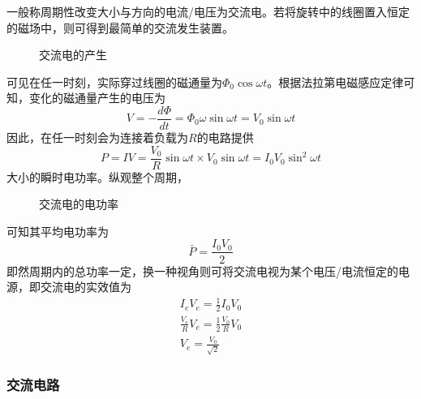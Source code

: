 一般称周期性改变大小与方向的电流/电压为交流电。若将旋转中的线圈置入恒定的磁场中，则可得到最简单的交流发生装置。
\begin{figure}[ht!]
    \centering
    \caption{交流电的产生}
\end{figure}
可见在任一时刻，实际穿过线圈的磁通量为$\Phi_0\cos\omega t$。根据法拉第电磁感应定律可知，变化的磁通量产生的电压为
\begin{equation*}
    V=-\frac{d\Phi}{dt}=\Phi_0\omega\sin\omega t=V_0\sin\omega t
\end{equation*}
因此，在任一时刻会为连接着负载为$R$的电路提供
\begin{equation*}
    P=IV
    =\frac{V_0}{R}\sin\omega t\times V_0\sin\omega t
    =I_0V_0\sin^2\omega t
\end{equation*}
大小的瞬时电功率。纵观整个周期，
\begin{figure}[ht!]
    \centering
    \caption{交流电的电功率}
\end{figure}
可知其平均电功率为
\begin{equation*}
    \bar{P}=\frac{I_0V_0}{2}
\end{equation*}
即然周期内的总功率一定，换一种视角则可将交流电视为某个电压/电流恒定的电源，即交流电的实效值为
\begin{gather*}
    I_eV_e=\frac12I_0V_0\\
    \frac{V_e}{R}V_e=\frac12\frac{V_0}{R}V_0\\
    V_e=\frac{V_0}{\sqrt2}
\end{gather*}

\subsubsection{交流电路}

